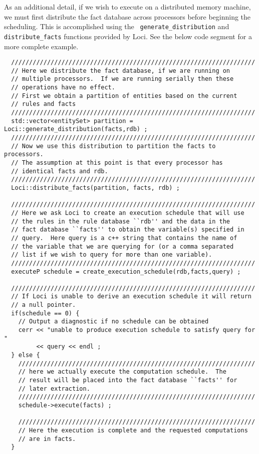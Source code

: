 \documentclass[10pt,epsf]{book}
\begin{document}
As an additional detail, if we wish to execute on a distributed memory
machine, we must first distribute the fact database across processors
before beginning the scheduling.  This is accomplished using the {\tt
  generate\_distribution} and {\tt distribute\_facts} functions
provided by Loci.  See the below code segment for a more complete
example.

\begin{verbatim}
  ////////////////////////////////////////////////////////////////////
  // Here we distribute the fact database, if we are running on
  // multiple processors.  If we are running serially then these
  // operations have no effect.
  // First we obtain a partition of entities based on the current
  // rules and facts
  ////////////////////////////////////////////////////////////////////
  std::vector<entitySet> partition = Loci::generate_distribution(facts,rdb) ;
  ////////////////////////////////////////////////////////////////////
  // Now we use this distribution to partition the facts to processors.
  // The assumption at this point is that every processor has 
  // identical facts and rdb.
  ////////////////////////////////////////////////////////////////////
  Loci::distribute_facts(partition, facts, rdb) ;

  ////////////////////////////////////////////////////////////////////
  // Here we ask Loci to create an execution schedule that will use
  // the rules in the rule database ``rdb'' and the data in the
  // fact database ``facts'' to obtain the variable(s) specified in
  // query.  Here query is a c++ string that contains the name of
  // the variable that we are querying for (or a comma separated
  // list if we wish to query for more than one variable).
  ////////////////////////////////////////////////////////////////////
  executeP schedule = create_execution_schedule(rdb,facts,query) ;

  ////////////////////////////////////////////////////////////////////
  // If Loci is unable to derive an execution schedule it will return
  // a null pointer.
  if(schedule == 0) {
    // Output a diagnostic if no schedule can be obtained
    cerr << "unable to produce execution schedule to satisfy query for "
         << query << endl ;
  } else {
    //////////////////////////////////////////////////////////////////
    // here we actually execute the computation schedule.  The
    // result will be placed into the fact database ``facts'' for
    // later extraction.
    //////////////////////////////////////////////////////////////////
    schedule->execute(facts) ;

    //////////////////////////////////////////////////////////////////
    // Here the execution is complete and the requested computations
    // are in facts.
  }
\end{verbatim}
\end{document}
